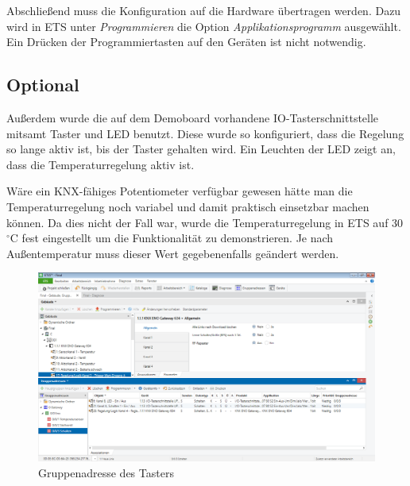 \documentclass[a4paper]{article}
\begin{document}
Abschließend muss die Konfiguration auf die Hardware übertragen werden. Dazu wird in ETS unter \emph{Programmieren} die Option \emph{Applikationsprogramm} ausgewählt. Ein Drücken der Programmiertasten auf den Geräten ist nicht notwendig.

\subsection{Optional}
Außerdem wurde die auf dem Demoboard vorhandene IO-Tasterschnittstelle mitsamt Taster und LED benutzt. Diese wurde so konfiguriert, dass die Regelung so lange aktiv ist, bis der Taster gehalten wird.
Ein Leuchten der LED zeigt an, dass die Temperaturregelung aktiv ist.

Wäre ein KNX-fähiges Potentiometer verfügbar gewesen hätte man die Temperaturregelung noch variabel und damit praktisch einsetzbar machen können.
Da dies nicht der Fall war, wurde die Temperaturregelung in ETS auf 30 $^{\circ}$C fest eingestellt um die Funktionalität zu demonstrieren. Je nach Außentemperatur muss dieser Wert gegebenenfalls geändert werden.

\begin{figure}[H]
	\centering
	\includegraphics[width=13cm]{Doku/19}
	\caption{Gruppenadresse des Tasters}
	\label{fig:19}
\end{figure}
\end{document}
